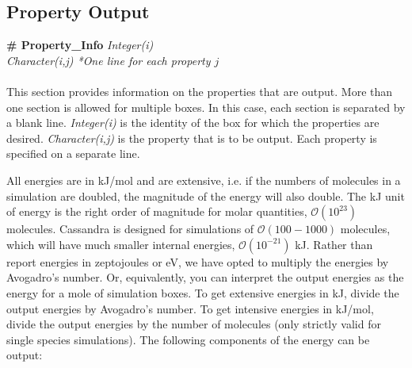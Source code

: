 %
%
%
\subsection{Property Output}\label{sec:Property_Info}
{\bf \# Property\_Info} {\it Integer(i)} \\
{\it Character(i,j) *One line for each property $j$} \\ \\
%
This section provides information on the properties that are output.
More than one section is allowed for multiple boxes.
In this case, each section is separated by a blank line.
{\it Integer(i)} is the identity of the box for which the properties are desired.
{\it Character(i,j)} is the property that is to be output.
Each property is specified on a separate line.

All energies are in kJ/mol and are extensive, i.e.
if the numbers of molecules in a simulation are doubled, the magnitude of the energy will also double.
The kJ unit of energy is the right order of magnitude for molar quantities, $\mathcal{O}(10^{23})$ molecules.
Cassandra is designed for simulations of $\mathcal{O}(100-1000)$ molecules,
which will have much smaller internal energies, $\mathcal{O}(10^{-21})$ kJ.
Rather than report energies in zeptojoules or eV, we have opted to multiply the energies by Avogadro's number.
Or, equivalently, you can interpret the output energies as the energy for a mole of simulation boxes.
To get extensive energies in kJ, divide the output energies by Avogadro's number.
To get intensive energies in kJ/mol, divide the output energies by the number of molecules
(only strictly valid for single species simulations).
The following components of the energy can be output:

